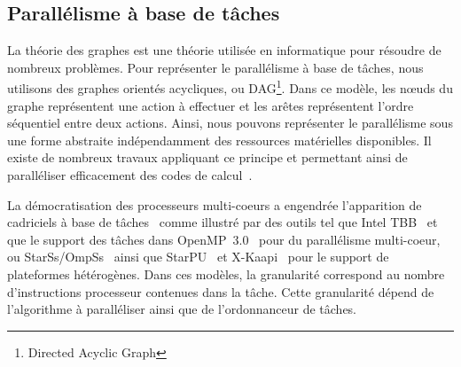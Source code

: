\subsection{Parallélisme à base de tâches}
La théorie des graphes est une théorie utilisée en informatique pour résoudre de nombreux problèmes.
%
%
%
Pour représenter le parallélisme à base de tâches, nous utilisons des graphes orientés acycliques, ou DAG\footnote{Directed Acyclic Graph}.
%
Dans ce modèle, les n{\oe}uds du graphe représentent une action à effectuer et les arêtes représentent l'ordre séquentiel entre deux actions.
%
Ainsi, nous pouvons représenter le parallélisme sous une forme abstraite indépendamment des ressources matérielles disponibles.
%
Il existe de nombreux travaux appliquant ce principe et permettant ainsi de paralléliser efficacement des codes de calcul~\cite{BBAC2014}\cite{LSAT2013}\cite{LY2012}\cite{ABGL2013}.


La démocratisation des processeurs multi-coeurs a engendrée l'apparition de cadriciels à base de tâches~\cite{taskscomparison} comme illustré par des outils tel que Intel TBB~\cite{Intel::TBB} et que le support des tâches dans OpenMP~3.0~\cite{openmptasks} pour du parallélisme multi-coeur, ou StarSs/OmpSs~\cite{OMPSs} ainsi que StarPU~\cite{starpu} et X-Kaapi~\cite{xkaapi} pour le support de plateformes hétérogènes.
%
Dans ces modèles, la granularité correspond au nombre d'instructions processeur contenues dans la tâche.
%
Cette granularité dépend de l'algorithme à paralléliser ainsi que de l'ordonnanceur de tâches.
